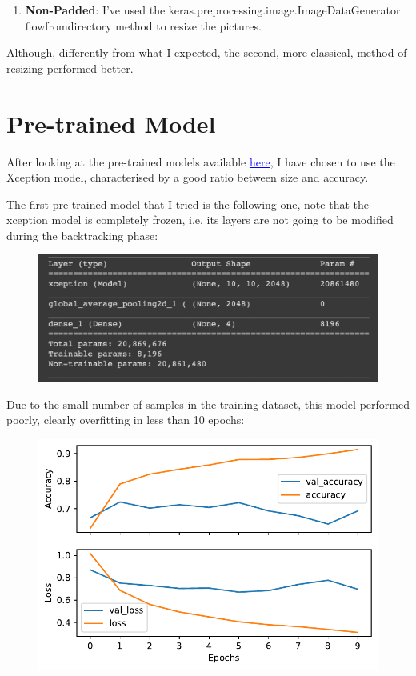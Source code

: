 \documentclass[a4paper]{article}
\begin{document}
\begin{enumerate}
\begin{figure} [h!]
\begin{subfigure}{0.5\textwidth}
  \caption{Resized picture with resolution 299x299}
  \label{fig:sub2}
\end{subfigure}
\label{fig:test}
\end{figure}

\item \textbf{Non-Padded}: I've used the keras.preprocessing.image.ImageDataGenerator flow\textunderscore from\textunderscore directory method to resize the pictures.
\end{enumerate}

Although, differently from what I expected, the second, more classical, method of resizing performed better.
\section{Pre-trained Model}
After looking at the pre-trained models available \href{https://keras.io/applications}{\textcolor{blue}{\underline{here}}}, I have chosen to use the Xception model, characterised by a good ratio between size and accuracy.

The first pre-trained model that I tried is the following one, note that the xception model is completely frozen, i.e. its layers are not going to be modified during the backtracking phase: 
\begin{figure} [h!]
\centering
\includegraphics[width=\textwidth]{first_model.png}
\label{fig: first_model}
\end{figure}

Due to the small number of samples in the training dataset, this model performed poorly, clearly overfitting in less than 10 epochs:
\begin{figure} [h!]
\centering
\includegraphics[width=\textwidth]{first_train.pdf}
\label{fig: first_train}
\end{figure}
\end{document}
